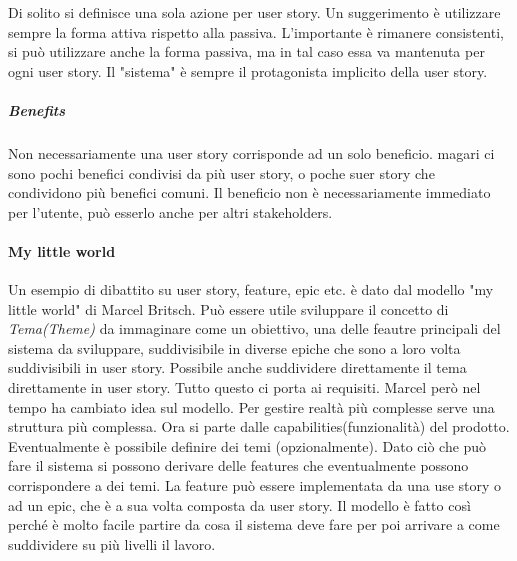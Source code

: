 \noindent Di solito si definisce una sola azione per user story. Un suggerimento è utilizzare sempre la forma attiva rispetto alla passiva. L'importante è rimanere consistenti, si può utilizzare anche la forma passiva, ma in tal caso essa va mantenuta per ogni user story. Il "sistema" è sempre il protagonista implicito della user story.
\subparagraph{Benefits}
Non necessariamente una user story corrisponde ad un solo beneficio. magari ci sono pochi benefici condivisi da più user story, o poche suer story che condividono più benefici comuni. Il beneficio non è necessariamente immediato per l'utente, può esserlo anche per altri stakeholders.

\paragraph{My little world}
Un esempio di dibattito su user story, feature, epic etc. è dato dal modello "my little world" di Marcel Britsch. Può essere utile sviluppare il concetto di \textit{Tema(Theme)} da immaginare come un obiettivo, una delle feautre principali del sistema da sviluppare, suddivisibile in diverse epiche che sono a loro volta suddivisibili in user story. Possibile anche suddividere direttamente il tema direttamente in user story. Tutto questo ci porta ai requisiti.\newline
{}
\noindent Marcel però nel tempo ha cambiato idea sul modello. Per gestire realtà più complesse serve una struttura più complessa. Ora si parte dalle capabilities(funzionalità) del prodotto. Eventualmente è possibile definire dei temi (opzionalmente). Dato ciò che può fare il sistema si possono derivare delle features che eventualmente possono corrispondere a dei temi. La feature può essere implementata da una use story o ad un epic, che è a sua volta composta da user story. Il modello è fatto così perché è molto facile partire da cosa il sistema deve fare per poi arrivare a come suddividere su più livelli il lavoro.

